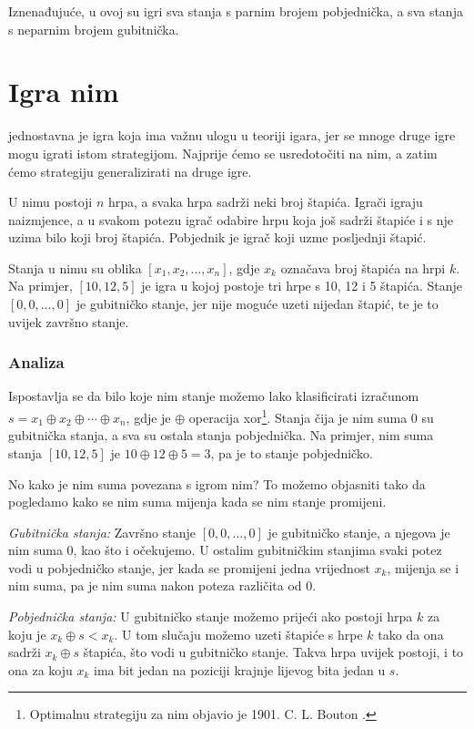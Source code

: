 Iznenađujuće, u ovoj su igri
sva stanja s parnim brojem pobjednička,
a sva stanja s neparnim brojem gubitnička.

\section{Igra nim}


 jednostavna je igra koja
ima važnu ulogu u teoriji igara,
jer se mnoge druge igre mogu igrati
istom strategijom.
Najprije ćemo se usredotočiti na nim,
a zatim ćemo strategiju generalizirati
na druge igre.

U nimu postoji $n$ hrpa,
a svaka hrpa sadrži neki broj štapića.
Igrači igraju naizmjence,
a u svakom potezu igrač odabire
hrpu koja još sadrži štapiće
i s nje uzima bilo koji broj štapića.
Pobjednik je igrač koji uzme posljednji štapić.

Stanja u nimu su oblika
$[x_1,x_2,\ldots,x_n]$,
gdje $x_k$ označava broj štapića na hrpi $k$.
Na primjer, $[10,12,5]$ je igra u kojoj
postoje tri hrpe s 10, 12 i 5 štapića.
Stanje $[0,0,\ldots,0]$ je gubitničko stanje,
jer nije moguće uzeti nijedan štapić,
te je to uvijek završno stanje.

\subsubsection{Analiza}

Ispostavlja se da bilo koje nim stanje možemo
lako klasificirati izračunom
 $s = x_1 \oplus x_2 \oplus \cdots \oplus x_n$,
gdje je $\oplus$ operacija xor\footnote{Optimalnu strategiju
za nim objavio je 1901. C. L. Bouton \cite{bou01}.}.
Stanja čija je nim suma 0 su gubitnička stanja,
a sva su ostala stanja pobjednička.
Na primjer, nim suma stanja
$[10,12,5]$ je $10 \oplus 12 \oplus 5 = 3$,
pa je to stanje pobjedničko.

No kako je nim suma povezana s igrom nim?
To možemo objasniti tako da pogledamo kako se nim
suma mijenja kada se nim stanje promijeni.

\textit{Gubitnička stanja:}
Završno stanje $[0,0,\ldots,0]$ je gubitničko stanje,
a njegova je nim suma 0, kao što i očekujemo.
U ostalim gubitničkim stanjima svaki potez vodi u
pobjedničko stanje, jer kada se promijeni jedna vrijednost $x_k$,
mijenja se i nim suma, pa je nim suma
nakon poteza različita od 0.

\textit{Pobjednička stanja:}
U gubitničko stanje možemo prijeći ako
postoji hrpa $k$ za koju je $x_k \oplus s < x_k$.
U tom slučaju možemo uzeti štapiće s
hrpe $k$ tako da ona sadrži $x_k \oplus s$ štapića,
što vodi u gubitničko stanje.
Takva hrpa uvijek postoji, i to ona za koju $x_k$
ima bit jedan na poziciji krajnje lijevog
bita jedan u $s$.

